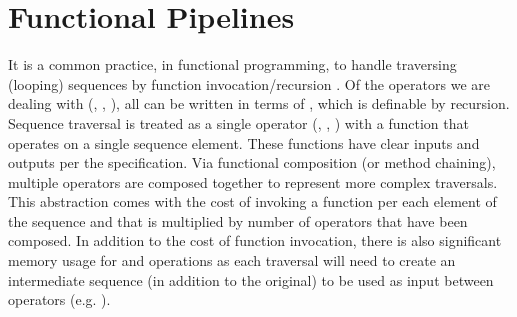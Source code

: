 \section{Functional Pipelines}
It is a common practice, in functional programming, to handle traversing (looping) sequences by function invocation/recursion \cite{recurse16}.  Of the operators we are dealing with (, , ), all can be written in terms of , which is definable by recursion. Sequence traversal is treated as a single operator (, , ) with a function that operates on a single sequence element. These functions have clear inputs and outputs per the \javascript specification.  Via functional composition (or method chaining), multiple operators are composed together to represent more complex traversals.  This abstraction comes with the cost of invoking a function per each element of the sequence and that is multiplied by number of operators that have been composed. In addition to the cost of function invocation, there is also significant memory usage for  and  operations as each traversal will need to create an intermediate sequence (in addition to the original) to be used as input between operators (e.g. ).  
